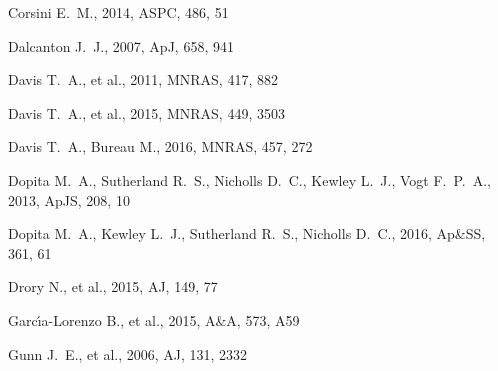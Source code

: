 \documentclass[a4paper,fleqn,usenatbib]{mnras}
\begin{document}
\begin{thebibliography}{}
 Corsini E.~M., 2014, ASPC, 486, 51 


 Dalcanton J.~J., 2007, ApJ, 658, 941 

 Davis T.~A., et al., 2011, MNRAS, 417, 882 

 Davis T.~A., et al., 2015, MNRAS, 449, 3503 

 Davis T.~A., Bureau M., 2016, MNRAS, 457, 272 

 Dopita M.~A., Sutherland R.~S., Nicholls D.~C., Kewley L.~J., Vogt F.~P.~A., 2013, ApJS, 208, 10 

 Dopita M.~A., Kewley L.~J., Sutherland R.~S., Nicholls D.~C., 2016, Ap\&SS, 361, 61 

 Drory N., et al., 2015, AJ, 149, 77 





 Garc{\'{\i}}a-Lorenzo B., et al., 2015, A\&A, 573, A59 


 Gunn J.~E., et al., 2006, AJ, 131, 2332 



\end{thebibliography}
\end{document}

